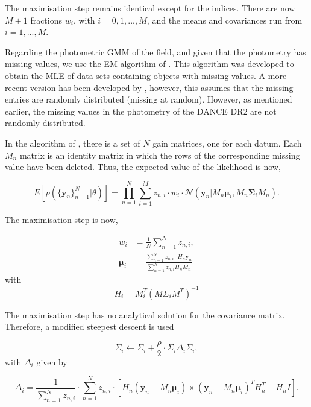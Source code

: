 The maximisation step remains identical except for the indices. There are now $M+1$ fractions $w_i$, with $i=0,1,...,M$, and the means and covariances run from $i=1,...,M$.

Regarding the photometric GMM of the field, and given that the photometry has missing values, we use the EM algorithm of \citet{McMichael1996}. This algorithm was developed to obtain the MLE of data sets containing objects with missing values. A more recent version has been developed by \citet{Lin2006}, however, this assumes that the missing entries are randomly distributed (missing at random). However,  as mentioned earlier, the missing values in the photometry of the DANCE DR2 are not randomly distributed.

In the algorithm of \citet{McMichael1996}, there is a set of $N$ gain matrices, one for each datum. Each $M_n$ matrix is an identity matrix in which the rows of the corresponding missing value have been deleted. Thus, the expected value of the likelihood is now,

\begin{equation}
E[p(\{\mathbf{y}_n\}_{n=1}^N|\theta)]=\prod_{n=1}^N {\sum_{i=1} ^M {z_{n,i}\cdot w_i\cdot \mathcal{N}(\mathbf{y}_n|M_n \boldsymbol{\mu}_i,M_n\boldsymbol{\Sigma}_i M_n)}}.
\end{equation}

The maximisation step is now,

\begin{align}
w_i &= \frac{1}{N} \sum_{n=1}^N z_{n,i}, \\
\boldsymbol{\mu}_i &= \frac{ \sum_{n=1}^N z_{n,i}\cdot H_n \mathbf{y}_n}{\sum_{n=1}^N z_{n,i} H_n M_n}
\end{align}
with 
\begin{equation}
H_i=M_i^T(M\Sigma_i M^T)^{-1}
\end{equation}

The maximisation step has no analytical solution for the covariance matrix. Therefore, a modified steepest descent is used

\begin{equation}
\Sigma_i \leftarrow \Sigma_i + \frac{\rho}{2}\cdot \Sigma_i\Delta_i\Sigma_i,
\end{equation}
with $\Delta_i$ given by

\begin{equation}
\Delta_i=  \frac{1}{\sum_{n=1}^N z_{n,i}}\cdot \sum_{n=1}^N z_{n,i} \cdot \left[H_n(\mathbf{y}_n -  M_n \boldsymbol{\mu}_i) \times  (\mathbf{y}_n -  M_n \boldsymbol{\mu}_i)^TH_n^T - H_nI\right].
\end{equation}
 

